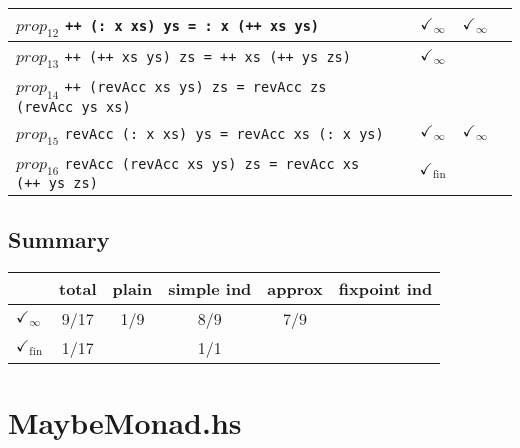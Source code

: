 \documentclass{article}
\begin{document}
\begin{longtable}{p{10cm} || c | c | c | c | }
\hline
$prop_{12}$ \newline \verb`++ (: x xs) ys = : x (++ xs ys)` &  & $\checkmark_{\infty}$ & $\checkmark_{\infty}$ &  \\
\hline
$prop_{13}$ \newline \verb`++ (++ xs ys) zs = ++ xs (++ ys zs)` &  & $\checkmark_{\infty}$ &  &  \\
\hline
$prop_{14}$ \newline \verb`++ (revAcc xs ys) zs = revAcc zs (revAcc ys xs)` &  &  &  &  \\
\hline
$prop_{15}$ \newline \verb`revAcc (: x xs) ys = revAcc xs (: x ys)` &  & $\checkmark_{\infty}$ & $\checkmark_{\infty}$ &  \\
\hline
$prop_{16}$ \newline \verb`revAcc (revAcc xs ys) zs = revAcc xs (++ ys zs)` &  & $\checkmark_{\mathrm{fin}}$ &  &  \\
\end{longtable}

\subsection*{Summary}
\begin{longtable}{p{4cm} || c | c | c | c | c | }
  & total & plain & simple ind & approx & fixpoint ind \\
\hline
$\checkmark_{\infty}$ & 9/17 & 1/9 & 8/9 & 7/9 & \\
\hline
$\checkmark_{\mathrm{fin}}$ & 1/17 &  & 1/1 &  & \\
\end{longtable}

\section*{MaybeMonad.hs}
\end{document}
